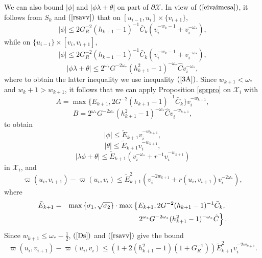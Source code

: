 \documentclass{article}
\begin{document}
We can also bound $|\phi|$ and $|\phi\lambda+\theta|$ on part
of $\partial\mathcal{X}$.
In view of $(\ref{eivaimesa})$,
it follows from
$S_k$ and $(\ref{rsavv})$ that
on $[u_{i-1},u_i]\times \{v_{i+1}\}$,
\begin{equation}
\label{As}
|\phi|\le 2G_R^{-2}(h_{k+1}-1)^{-1}\bar{C}_k(v_i^{-w_k-1}+v_i^{-\omega_*}),
\end{equation}
while on 
$\{u_{i-1}\}\times[v_i,v_{i+1}]$, 
\begin{equation}
\label{Bs}
|\phi|\le 2G_R^{-2}(h_{k+1}-1)^{-1}\bar{C}_k(v_i^{-w_k-1}+v_i^{-\omega_*}),
\end{equation}
\begin{equation}
\label{kiautomnto3exvame}
|\phi\lambda+\theta|\le 2^{\omega_*}G^{-2\omega_*}(h^2_{k+1}-1)^{-\omega_*}\hat{C}v_i^{-\omega_*},
\end{equation}
where to obtain the latter inequality we use inequality $(\ref{3A})$.
Since $w_{k+1}<\omega_*$ and $w_k+1>w_{k+1}$, 
it follows that we can apply 
Proposition \ref{sprpro} on $\mathcal{X}_i$ 
with 
\[
A=\max\{E_{k+1},2G^{-2}(h_{k+1}-1)^{-1}\bar{C}_k\} v_i^{-w_{k+1}},
\] 
\[
B=2^{\omega_*}G^{-2\omega_*}(h^2_{k+1}-1)^{-\omega_*}\hat{C}v_i^{-w_{k+1}},
\]
to obtain
\begin{equation}
\label{...}
|\phi|\le\tilde{E}_{k+1}v_i^{-w_{k+1}},
\end{equation}
\[
|\theta|\le{\tilde{E}}_{k+1}v_i^{-w_{k+1}},
\]
\begin{equation}
\label{Cs}
|\lambda\phi+\theta|\le
{\tilde{E}}_{k+1}\left(v_i^{-\omega_*}+r^{-1}v_i^{-w_{k+1}}\right)
\end{equation}
in $\mathcal{X}_i$,
and 
\begin{equation}
\label{Ds}
\varpi(u_i,v_{i+1})-\varpi(u_i,v_i)\le\tilde{E}_{k+1}^2
\left(v_i^{-2w_{k+1}}
+r(u_i,v_{i+1})v_i^{-2\omega_*}\right),
\end{equation}
where
\begin{eqnarray*}
{\tilde{E}}_{k+1}&=&\max\left\{\sigma_1,\sqrt{\sigma_2}\right\}
\cdot\max\left\{E_{k+1},2G^{-2}(h_{k+1}-1)^{-1}\bar{C}_k,\right.\\
&&\hbox{\ }\left.2^{\omega_*}G^{-2\omega_*}(h^2_{k+1}-1)^{-\omega_*}\hat{C}\right\}.
\end{eqnarray*}
Since $w_{k+1}\le\omega_*-\frac12$, $(\ref{Ds})$ and $(\ref{rsavv})$
give the bound
\begin{equation}
\label{kiedwflux}
\varpi(u_i,v_{i+1})-\varpi(u_i,v_i)\le(1+2(h_{k+1}^2-1)(1+G_R^{-1}))
\tilde{E}_{k+1}^2v_i^{-2w_{k+1}}.
\end{equation}
\end{document}
